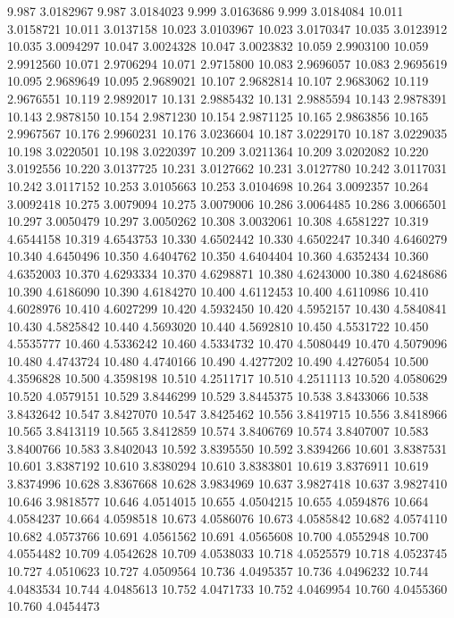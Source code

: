 9.987 3.0182967
9.987 3.0184023
9.999 3.0163686
9.999 3.0184084
10.011 3.0158721
10.011 3.0137158
10.023 3.0103967
10.023 3.0170347
10.035 3.0123912
10.035 3.0094297
10.047 3.0024328
10.047 3.0023832
10.059 2.9903100
10.059 2.9912560
10.071 2.9706294
10.071 2.9715800
10.083 2.9696057
10.083 2.9695619
10.095 2.9689649
10.095 2.9689021
10.107 2.9682814
10.107 2.9683062
10.119 2.9676551
10.119 2.9892017
10.131 2.9885432
10.131 2.9885594
10.143 2.9878391
10.143 2.9878150
10.154 2.9871230
10.154 2.9871125
10.165 2.9863856
10.165 2.9967567
10.176 2.9960231
10.176 3.0236604
10.187 3.0229170
10.187 3.0229035
10.198 3.0220501
10.198 3.0220397
10.209 3.0211364
10.209 3.0202082
10.220 3.0192556
10.220 3.0137725
10.231 3.0127662
10.231 3.0127780
10.242 3.0117031
10.242 3.0117152
10.253 3.0105663
10.253 3.0104698
10.264 3.0092357
10.264 3.0092418
10.275 3.0079094
10.275 3.0079006
10.286 3.0064485
10.286 3.0066501
10.297 3.0050479
10.297 3.0050262
10.308 3.0032061
10.308 4.6581227
10.319 4.6544158
10.319 4.6543753
10.330 4.6502442
10.330 4.6502247
10.340 4.6460279
10.340 4.6450496
10.350 4.6404762
10.350 4.6404404
10.360 4.6352434
10.360 4.6352003
10.370 4.6293334
10.370 4.6298871
10.380 4.6243000
10.380 4.6248686
10.390 4.6186090
10.390 4.6184270
10.400 4.6112453
10.400 4.6110986
10.410 4.6028976
10.410 4.6027299
10.420 4.5932450
10.420 4.5952157
10.430 4.5840841
10.430 4.5825842
10.440 4.5693020
10.440 4.5692810
10.450 4.5531722
10.450 4.5535777
10.460 4.5336242
10.460 4.5334732
10.470 4.5080449
10.470 4.5079096
10.480 4.4743724
10.480 4.4740166
10.490 4.4277202
10.490 4.4276054
10.500 4.3596828
10.500 4.3598198
10.510 4.2511717
10.510 4.2511113
10.520 4.0580629
10.520 4.0579151
10.529 3.8446299
10.529 3.8445375
10.538 3.8433066
10.538 3.8432642
10.547 3.8427070
10.547 3.8425462
10.556 3.8419715
10.556 3.8418966
10.565 3.8413119
10.565 3.8412859
10.574 3.8406769
10.574 3.8407007
10.583 3.8400766
10.583 3.8402043
10.592 3.8395550
10.592 3.8394266
10.601 3.8387531
10.601 3.8387192
10.610 3.8380294
10.610 3.8383801
10.619 3.8376911
10.619 3.8374996
10.628 3.8367668
10.628 3.9834969
10.637 3.9827418
10.637 3.9827410
10.646 3.9818577
10.646 4.0514015
10.655 4.0504215
10.655 4.0594876
10.664 4.0584237
10.664 4.0598518
10.673 4.0586076
10.673 4.0585842
10.682 4.0574110
10.682 4.0573766
10.691 4.0561562
10.691 4.0565608
10.700 4.0552948
10.700 4.0554482
10.709 4.0542628
10.709 4.0538033
10.718 4.0525579
10.718 4.0523745
10.727 4.0510623
10.727 4.0509564
10.736 4.0495357
10.736 4.0496232
10.744 4.0483534
10.744 4.0485613
10.752 4.0471733
10.752 4.0469954
10.760 4.0455360
10.760 4.0454473
